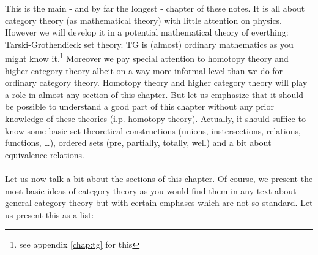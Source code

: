 This is the main - and by far the longest - chapter of these notes. It is all about category theory (as mathematical theory) with little attention on physics. However we will develop it in a potential mathematical theory of everthing: Tarski-Grothendieck set theory. TG is (almost) ordinary mathematics as you might know it.\footnote{see appendix \ref{chap:tg} for this} Moreover we pay special attention to homotopy theory and higher category theory albeit on a way more informal level than we do for ordinary category theory. Homotopy theory and higher category theory will play a role in almost any section of this chapter. But let us emphasize that it should be possible to understand a good part of this chapter without any prior knowledge of these theories (i.p. homotopy theory). Actually, it should suffice to know some basic set theoretical constructions (unions, instersections, relations, functions, \ldots), ordered sets (pre, partially, totally, well) and a bit about equivalence relations.
\\\\
Let us now talk a bit about the sections of this chapter. Of course, we present the most basic ideas of category theory as you would find them in any text about general category theory but with certain emphases which are not so standard. Let us present this as a list:
